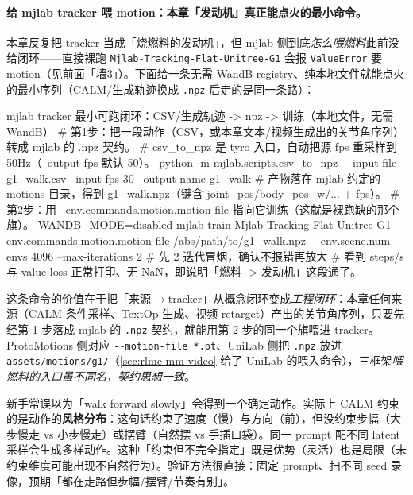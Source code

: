\paragraph{给 mjlab tracker 喂 motion：本章「发动机」真正能点火的最小命令。}本章反复把 tracker 当成「烧燃料的发动机」，但 mjlab 侧到底\emph{怎么喂燃料}此前没给闭环——直接裸跑 \verb|Mjlab-Tracking-Flat-Unitree-G1| 会报 \verb|ValueError| 要 motion（见前面「墙3」）。下面给一条无需 WandB registry、纯本地文件就能点火的最小序列（CALM/生成轨迹换成 \verb|.npz| 后走的是同一条路）：

\begin{codebox}[bash]{mjlab tracker 最小可跑闭环：CSV/生成轨迹 -> npz -> 训练（本地文件，无需 WandB）}
# 第1步：把一段动作（CSV，或本章文本/视频生成出的关节角序列）转成 mjlab 的 .npz 契约。
#   csv_to_npz 是 tyro 入口，自动把源 fps 重采样到 50Hz（--output-fps 默认 50）。
python -m mjlab.scripts.csv_to_npz \
    --input-file g1_walk.csv --input-fps 30 --output-name g1_walk
#   产物落在 mjlab 约定的 motions 目录，得到 g1_walk.npz（键含 joint_pos/body_pos_w/... + fps）。
# 第2步：用 --env.commands.motion.motion-file 指向它训练（这就是裸跑缺的那个旗）。
WANDB_MODE=disabled mjlab train Mjlab-Tracking-Flat-Unitree-G1 \
    --env.commands.motion.motion-file /abs/path/to/g1_walk.npz \
    --env.scene.num-envs 4096 --max-iterations 2        # 先 2 迭代冒烟，确认不报错再放大
# 看到 steps/s 与 value loss 正常打印、无 NaN，即说明「燃料 -> 发动机」这段通了。
\end{codebox}

\noindent 这条命令的价值在于把「来源$\to$tracker」从概念闭环变成\emph{工程闭环}：本章任何来源（CALM 条件采样、TextOp 生成、视频 retarget）产出的关节角序列，只要先经第 1 步落成 mjlab 的 \verb|.npz| 契约，就能用第 2 步的同一个旗喂进 tracker。ProtoMotions 侧对应 \verb|--motion-file *.pt|、UniLab 侧把 \verb|.npz| 放进 \verb|assets/motions/g1/|（\cref{sec:rlmc-mm-video} 给了 UniLab 的喂入命令），三框架\emph{喂燃料的入口虽不同名，契约思想一致}。

\begin{insight}\label{ins:rlmc-mm-calm-style}
新手常误以为「walk forward slowly」会得到一个确定动作。实际上 CALM 约束的是动作的\textbf{风格分布}：这句话约束了速度（慢）与方向（前），但没约束步幅（大步慢走 vs 小步慢走）或摆臂（自然摆 vs 手插口袋）。同一 prompt 配不同 latent 采样会生成多样动作。这种「约束但不完全指定」既是优势（灵活）也是局限（未约束维度可能出现不自然行为）。验证方法很直接：固定 prompt、扫不同 seed 录像，预期「都在走路但步幅/摆臂/节奏有别」。
\end{insight}

